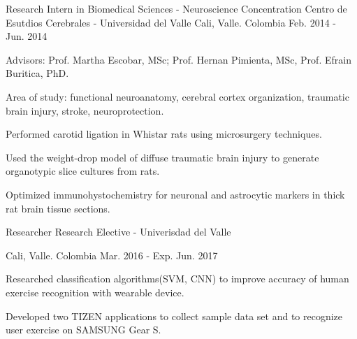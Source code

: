 \begin{cventries}
  \cventry
    {Research Intern in Biomedical Sciences - Neuroscience Concentration} %
    {Centro de Esutdios Cerebrales - Universidad del Valle} %
    {Cali, Valle. Colombia} %
    {Feb. 2014 - Jun. 2014} %
    {
      \begin{cvitems} %
        \item {Advisors: Prof. Martha Escobar, MSc; Prof. Hernan Pimienta, MSc, Prof. Efrain Buritica, PhD.}
        \item {Area of study: functional neuroanatomy, cerebral cortex organization, traumatic brain injury, stroke, neuroprotection.}
        \item {Performed carotid ligation in Whistar rats using microsurgery techniques.}
        \item {Used the weight-drop model of diffuse traumatic brain injury to generate organotypic slice cultures from rats.}
        \item {Optimized immunohystochemistry for neuronal and astrocytic markers in thick rat brain tissue sections.}
      \end{cvitems}
    }

  \cventry
    {Researcher} %
    {Research Elective - Univerisdad del Valle} %
    {Cali, Valle. Colombia %
    {Mar. 2016 - Exp. Jun. 2017} %
    {
      \begin{cvitems} %
        \item {Researched classification algorithms(SVM, CNN) to improve accuracy of human exercise recognition with wearable device.}
        \item {Developed two TIZEN applications to collect sample data set and to recognize user exercise on SAMSUNG Gear S.}
      \end{cvitems}
    }


}
\end{cventries}
